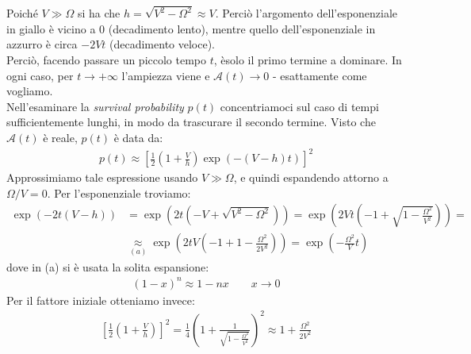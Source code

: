\documentclass[../../InformazioneQuantistica.tex]{subfiles}
\begin{document}
Poiché $V\gg \Omega$ si ha che $h=\sqrt{V^2-\Omega^2}\approx V$. Perciò l'argomento dell'esponenziale in giallo è vicino a $0$ (decadimento lento), mentre quello dell'esponenziale in azzurro è circa $-2Vt$ (decadimento veloce).\\
Perciò, facendo passare un piccolo tempo $t$, èsolo il primo termine a dominare. In ogni caso, per $t\to +\infty$ l'ampiezza viene  e $\mathcal{A}(t) \to 0$ - esattamente come vogliamo.\\ 
Nell'esaminare la \textit{survival probability} $p(t)$ concentriamoci sul caso di tempi sufficientemente lunghi, in modo da trascurare il secondo termine. Visto che $\mathcal{A}(t)$ è reale, $p(t)$ è data da:
\begin{align*}
p(t) \approx \left[\frac{1}{2}\left(1+\frac{V}{h}\right)\exp(-(V-h)t)\right]^2
\end{align*}
Approssimiamo tale espressione usando $V \gg \Omega$, e quindi espandendo attorno a $\Omega/V=0$. Per l'esponenziale troviamo:
\begin{align*}
\exp(-2t(V-h)) &= \exp(2t(-V+\sqrt{V^2-\Omega^2}
))=\exp\left(2Vt\left(-1+\sqrt{1-\frac{\Omega^2}{V^2}}\right)\right) =\\
&\underset{(a)}{\approx}\exp\left(2tV\left(-1+1-\frac{\Omega^2}{2V^2}\right)\right)=\exp\left(-\frac{\Omega^2}{V}t\right)
\end{align*}
dove in (a) si è usata la solita espansione:
\begin{align*}
(1-x)^n \approx 1-nx \qquad x\to 0
\end{align*}
Per il fattore iniziale otteniamo invece:
\begin{align*}
\left[\frac{1}{2}\left(1+\frac{V}{h}\right)\right]^2=
\frac{1}{4}\left(1+\frac{1}{\sqrt{1-\frac{\Omega^2}{V^2}}}\right)^2 \approx 1 + \frac{\Omega^2}{2V^2}
\end{align*}
\end{document}

